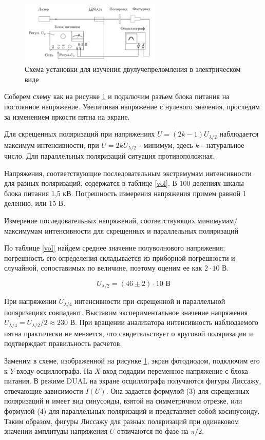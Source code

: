 \documentclass[a4paper, 12pt]{article}%
\begin{document}
	\begin{figure}[h]
		\centering	
		\includegraphics[width=0.6\textwidth]{fullpic.png}
		\caption{Схема установки для изучения двулучепреломления в электрическом виде}
		\label{full}
	\end{figure}
	
	Соберем схему как на рисунке \ref{full} и подключим разъем блока питания на постоянное напряжение. Увеличивая напряжение с нулевого значения, проследим за изменением яркости пятна на экране. 
	
	Для скрещенных поляризаций при напряжениях $U = (2k - 1)U_{\lambda/2}$ наблюдается максимум интенсивности, при $U = 2kU_{\lambda/2}$ - минимум, здесь $k$ - натуральное число. Для параллельных поляризаций ситуация противоположная. 
	
	Напряжения, соответствующие последовательным экстремумам интенсивности для разных поляризаций, содержатся в таблице \ref{vol}.	В 100 делениях шкалы блока питания 1,5 кВ. Погрешность измерения напряжения примем равной 1 делению, или 15 В. 
	
	\begin{table}[h]
		\centering
		
		\caption{Измерение последовательных напряжений, соответствующих минимумам/максимумам интенсивности для скрещенных и параллельных поляризаций}
		\label{vol}
	\end{table}	
	
	По таблице \ref{vol} найдем среднее значение полуволнового напряжения; погрешность его определения складывается из приборной погрешности и случайной, сопоставимых по величине, поэтому оценим ее как $2\cdot 10$ В. 
	
	\[ U_{\lambda/2} = (46 \pm 2) \cdot 10 \text{ В} \] 
	
	При напряжении $U_{\lambda/4}$ интенсивности при скрещенной и параллельной поляризациях совпадают. Выставим экспериментальное значение напряжения $U_{\lambda/4} = U_{\lambda/2}/2 \approx 230$ В. При вращении анализатора интенсивность наблюдаемого пятна практически не меняется, что свидетельствует о круговой поляризации и подтверждает правильность расчетов.  
	
	Заменим в схеме, изображенной на рисунке \ref{full}, экран фотодиодом, подключим его к $Y$-входу осциллографа. На $X$-вход подадим переменное напряжение с блока питания. В режиме DUAL на экране осциллографа получаются фигуры Лиссажу, отвечающие зависимости $I(U)$. Она задается формулой (3) для скрещенных поляризаций и имеет вид синусоиды, взятой на симметричном отрезке, или формулой (4) для параллельных поляризаций и представляет собой косинусоиду. Таким образом, фигуры Лиссажу для разных поляризаций при одинаковом значении амплитуды напряжения $U$ отличаются по фазе на $\pi/2$.
	
\end{document}
